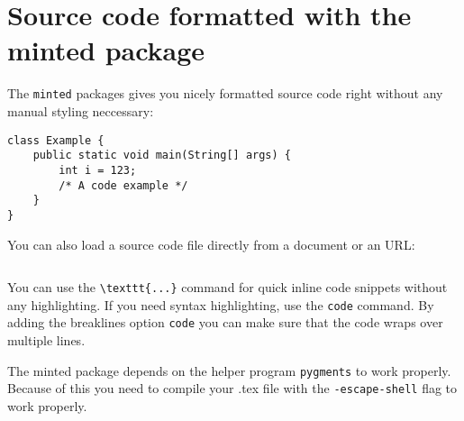 \documentclass{article}
\begin{document}
\section*{Source code formatted with the minted package}

\noindent The \texttt{minted} packages gives you nicely formatted source code right without any manual styling neccessary:

\begin{verbatim}
class Example {
    public static void main(String[] args) {
        int i = 123;
        /* A code example */
    }
}
\end{verbatim}

\bigskip

\noindent You can also load a source code file directly from a document or an
URL:

\inputminted{python}{./example_code/example.py}

\bigskip

\noindent You can use the \texttt{\textbackslash texttt\{...\}} command for quick inline code snippets without any highlighting. If you need syntax highlighting, use the \newline \texttt{\texttt{code}} command. By adding the breaklines option \newline \texttt{\texttt{code}} you can make sure that the code wraps over multiple lines.

\bigskip

\noindent The minted package depends on the helper program \texttt{pygments} to work properly. Because of this you need to compile your .tex file with the \texttt{-escape-shell} flag to work properly.
\end{document}
